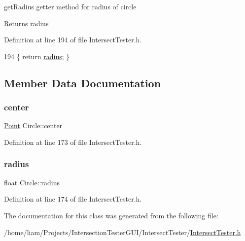 get\+Radius getter method for radius of circle 

\begin{DoxyReturn}{Returns}
radius 
\end{DoxyReturn}


Definition at line 194 of file Intersect\+Tester.\+h.


\begin{DoxyCode}
194 \{ \textcolor{keywordflow}{return} \hyperlink{class_circle_a47644132ec8bec0f3a4e8d0e15bcd5d3}{radius}; \}
\end{DoxyCode}


\subsection{Member Data Documentation}
\mbox{\label{class_circle_a8c4026a5a34d2df1527f019dd456317b}} 
\subsubsection{\texorpdfstring{center}{center}}
{\footnotesize\ttfamily \hyperlink{class_point}{Point} Circle\+::center}



Definition at line 173 of file Intersect\+Tester.\+h.

\mbox{\label{class_circle_a47644132ec8bec0f3a4e8d0e15bcd5d3}} 
\subsubsection{\texorpdfstring{radius}{radius}}
{\footnotesize\ttfamily float Circle\+::radius}



Definition at line 174 of file Intersect\+Tester.\+h.



The documentation for this class was generated from the following file\+:\begin{DoxyCompactItemize}
\item 
/home/liam/\+Projects/\+Intersection\+Tester\+G\+U\+I/\+Intersect\+Tester/\hyperlink{_intersect_tester_8h}{Intersect\+Tester.\+h}\end{DoxyCompactItemize}
